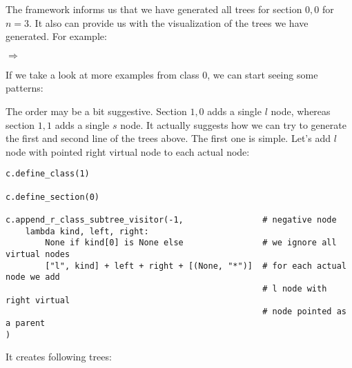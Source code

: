 \documentclass[final]{article}
\theoremstyle{definition}
\theoremstyle{definition}
\theoremstyle{remark}
\newcommand{\includeinlinesvg}[2]{\begin{minipage}{#1\textwidth}\end{minipage}}
\begin{document}
The framework informs us that we have generated all trees for section \(0,0\) for \(n = 3\). It also can provide us with the visualization of the trees we have generated. For example:

\includeinlinesvg{.19}{lambda__trees_00__4_base}%
\(\Rightarrow\)
\includeinlinesvg{.19}{lambda__trees_00__4}%
\includeinlinesvg{.19}{lambda__trees_00__5}%
\includeinlinesvg{.19}{lambda__trees_00__6}%
\includeinlinesvg{.19}{lambda__trees_00__7}%

If we take a look at more examples from class \(0\), we can start seeing some patterns:

\includeinlinesvg{.33}{lambda__trees_00__2}%
\includeinlinesvg{.33}{lambda__trees_00__3}%
\includeinlinesvg{.33}{lambda__trees_00__7}%

\includeinlinesvg{.33}{lambda__trees_00__4}%
\includeinlinesvg{.33}{lambda__trees_00__12}%
\includeinlinesvg{.33}{lambda__trees_00__13}%

\includeinlinesvg{.16}{lambda__trees_00__0}%
\includeinlinesvg{.16}{lambda__trees_00__1}%
\includeinlinesvg{.16}{lambda__trees_00__5}%
\includeinlinesvg{.16}{lambda__trees_00__6}%
\includeinlinesvg{.16}{lambda__trees_00__14}%
\includeinlinesvg{.16}{lambda__trees_00__15}%

\includeinlinesvg{.25}{lambda__trees_00__8}%
\includeinlinesvg{.25}{lambda__trees_00__9}%
\includeinlinesvg{.25}{lambda__trees_00__10}%
\includeinlinesvg{.25}{lambda__trees_00__11}%

The order may be a bit suggestive. Section \(1,0\) adds a single \(l\) node, whereas section \(1,1\) adds a single \(s\) node. It actually suggests how we can try to generate the first and second line of the trees above. The first one is simple. Let's add \(l\) node with pointed right virtual node to each actual node:

\begin{lstlisting}
c.define_class(1)

c.define_section(0)

c.append_r_class_subtree_visitor(-1,                # negative node
    lambda kind, left, right:
        None if kind[0] is None else                # we ignore all virtual nodes
        ["l", kind] + left + right + [(None, "*")]  # for each actual node we add
                                                    # l node with right virtual
                                                    # node pointed as a parent
)
\end{lstlisting}

It creates following trees:
\end{document}

